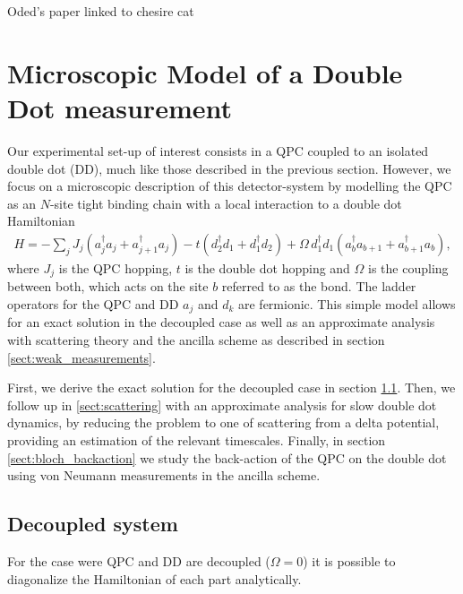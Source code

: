 \documentclass{article}
\begin{document}
Oded's paper linked to chesire cat

\section{Microscopic Model of a Double Dot measurement}\label{sect:microscopic_model}

Our experimental set-up of interest consists in a QPC coupled to an isolated double dot (DD), much like 
those described in the previous section. However, we focus on a microscopic description of this
detector-system by modelling the QPC as an  $N$-site tight binding chain with a local interaction
to a double dot Hamiltonian
\begin{align}\label{eq:qpc_dd_H}
    H = -\sum_{j}J_{j}(a_{j}^{\dagger} a_{j} + a_{j+1}^{\dagger}a_{j} ) - 
    t(d_{2}^{\dagger}d_{1}+d_{1}^{\dagger}d_{2}) +  \Omega \, d_{1}^{\dagger}d_{1}( a_{b}^{\dagger}a_{b+1} 
    + a^{\dagger}_{b+1}a_{b} ),
\end{align}
where $J_j$ is the QPC hopping, $t$ is the double dot hopping and $\Omega$ is the coupling between 
both, which acts on the site $b$ referred to as the bond. The ladder operators for the QPC 
and DD $a_j$ and $d_k$ are fermionic. This simple model allows for an exact solution in the decoupled case 
as well as an approximate analysis with scattering theory and the ancilla scheme 
as described in section \ref{sect:weak_measurements}.

First, we derive the exact solution for the decoupled case in section \ref{sect:decoupled_system}.
Then, we follow up in \ref{sect:scattering} with an approximate analysis for
slow double dot dynamics, by reducing the problem to one of 
scattering from a delta potential, providing an estimation of the relevant timescales. 
Finally, in section \ref{sect:bloch_backaction} we study the back-action of the 
QPC on the double dot using von Neumann measurements in the ancilla scheme. 

\subsection{Decoupled system}\label{sect:decoupled_system}

For the case were QPC and DD are decoupled ($\Omega = 0$) it is possible to diagonalize the 
Hamiltonian of each part analytically. 
\end{document}
